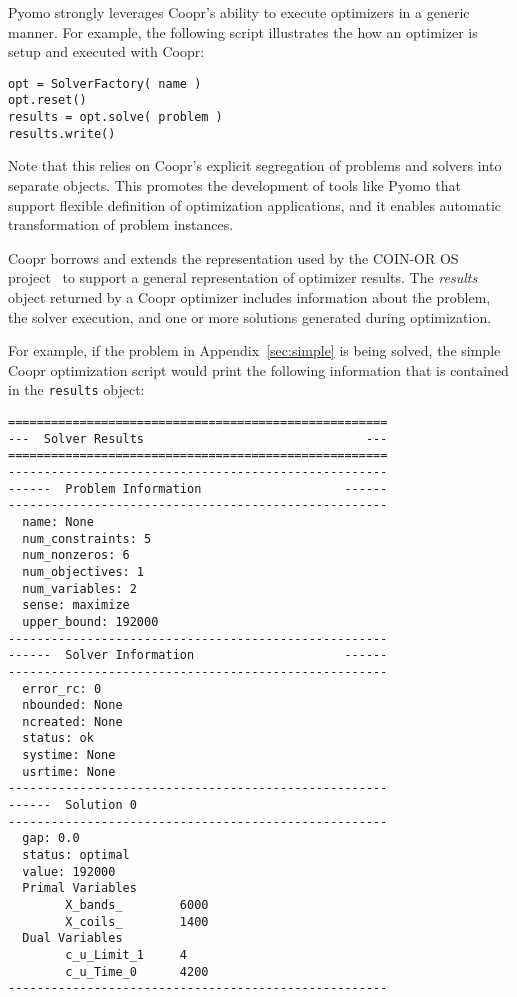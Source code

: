 Pyomo strongly leverages Coopr's ability to 
execute optimizers in a generic manner.  For example, the following script illustrates the 
how an optimizer is setup and executed with Coopr:
\begin{lstlisting}
opt = SolverFactory( name )
opt.reset()
results = opt.solve( problem )
results.write()
\end{lstlisting}
Note that this relies on Coopr's explicit segregation of problems and solvers into separate objects.  This promotes the development of tools like Pyomo that support flexible definition of optimization applications, and it enables automatic transformation of problem instances.

Coopr borrows and extends the representation used by the COIN-OR OS project~\citep{OS} to support a general representation of optimizer results.  The {\em results} object returned by a Coopr optimizer includes information about the problem, the solver execution, and one or more solutions generated during optimization.

For example, if the problem in Appendix~\ref{sec:simple} is being solved, the simple Coopr optimization script would print the following information that is contained in the {\tt results} object:
\begin{lstlisting}
=====================================================
---  Solver Results                               ---
=====================================================
-----------------------------------------------------
------  Problem Information                    ------
-----------------------------------------------------
  name: None
  num_constraints: 5
  num_nonzeros: 6
  num_objectives: 1
  num_variables: 2
  sense: maximize
  upper_bound: 192000
-----------------------------------------------------
------  Solver Information                     ------
-----------------------------------------------------
  error_rc: 0
  nbounded: None
  ncreated: None
  status: ok
  systime: None
  usrtime: None
-----------------------------------------------------
------  Solution 0
-----------------------------------------------------
  gap: 0.0
  status: optimal
  value: 192000
  Primal Variables
        X_bands_        6000
        X_coils_        1400
  Dual Variables
        c_u_Limit_1     4
        c_u_Time_0      4200
-----------------------------------------------------
\end{lstlisting}



